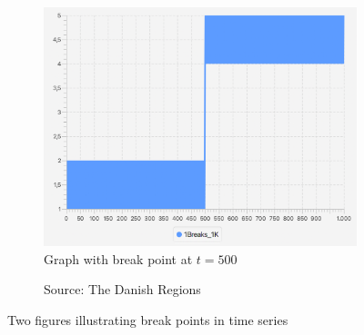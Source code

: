 \begin{figure}[h]
    \centering
    \begin{subfigure}[b]{0.48\textwidth}
        \centering
        \includegraphics[width=\textwidth]{fig/simple-graph.png}
        \caption{Graph with break point at $t = 500$}
        \label{fig:simple-graph}
    \end{subfigure}
    \hfill
    \begin{subfigure}[b]{0.48\textwidth}
        \centering
        \caption{Source: The Danish Regions}
        \label{fig:covid19-dk-en}
    \end{subfigure}
    \caption{Two figures illustrating break points in time series}
    \label{fig:intro-figure}
\end{figure}